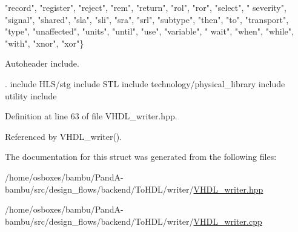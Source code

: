\begin{DoxyCode}
        \textcolor{stringliteral}{"record"}, \textcolor{stringliteral}{"register"},  \textcolor{stringliteral}{"reject"},
                                         \textcolor{stringliteral}{"rem"},           \textcolor{stringliteral}{"return"},   \textcolor{stringliteral}{"rol"},        \textcolor{stringliteral}{"ror"},    \textcolor{stringliteral}{"select"},   \textcolor{stringliteral}{"
      severity"}, \textcolor{stringliteral}{"signal"},       \textcolor{stringliteral}{"shared"},  \textcolor{stringliteral}{"sla"},     \textcolor{stringliteral}{"sli"},       \textcolor{stringliteral}{"sra"},       \textcolor{stringliteral}{"srl"},      \textcolor{stringliteral}{"subtype"},  \textcolor{stringliteral}{"then"},  
        \textcolor{stringliteral}{"to"},     \textcolor{stringliteral}{"transport"}, \textcolor{stringliteral}{"type"},
                                         \textcolor{stringliteral}{"unaffected"},    \textcolor{stringliteral}{"units"},    \textcolor{stringliteral}{"until"},      \textcolor{stringliteral}{"use"},    \textcolor{stringliteral}{"variable"}, \textcolor{stringliteral}{"
      wait"},     \textcolor{stringliteral}{"when"},         \textcolor{stringliteral}{"while"},   \textcolor{stringliteral}{"with"},    \textcolor{stringliteral}{"xnor"},      \textcolor{stringliteral}{"xor"}\}
\end{DoxyCode}


Autoheader include. 

. include H\+L\+S/stg include S\+TL include technology/physical\+\_\+library include utility include 

Definition at line 63 of file V\+H\+D\+L\+\_\+writer.\+hpp.



Referenced by V\+H\+D\+L\+\_\+writer().



The documentation for this struct was generated from the following files\+:\begin{DoxyCompactItemize}
\item 
/home/osboxes/bambu/\+Pand\+A-\/bambu/src/design\+\_\+flows/backend/\+To\+H\+D\+L/writer/\hyperlink{VHDL__writer_8hpp}{V\+H\+D\+L\+\_\+writer.\+hpp}\item 
/home/osboxes/bambu/\+Pand\+A-\/bambu/src/design\+\_\+flows/backend/\+To\+H\+D\+L/writer/\hyperlink{VHDL__writer_8cpp}{V\+H\+D\+L\+\_\+writer.\+cpp}\end{DoxyCompactItemize}
